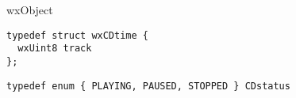 %
%

\section{}\label{wxcdaudio}


wxObject


{\small
\begin{verbatim}
typedef struct wxCDtime {
  wxUint8 track
};
\end{verbatim}
}
{\small \begin{verbatim}
typedef enum { PLAYING, PAUSED, STOPPED } CDstatus
\end{verbatim}}


